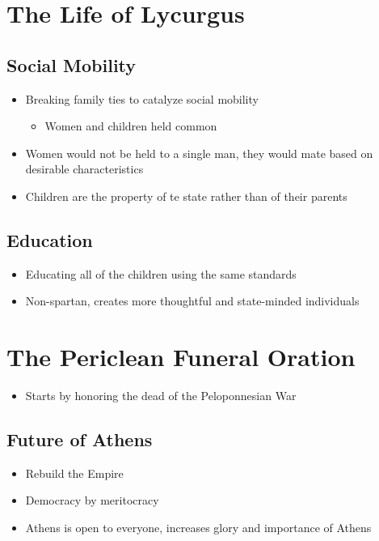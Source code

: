 \documentclass[11pt]{article}
\begin{document}
\section{The Life of Lycurgus}
\label{sec:orge5442ac}
\subsection{Social Mobility}
\label{sec:org0357bdb}
\begin{itemize}
\item Breaking family ties to catalyze social mobility
\begin{itemize}
\item Women and children held common
\end{itemize}
\item Women would not be held to a single man, they would mate based on desirable characteristics
\item Children are the property of te state rather than of their parents
\end{itemize}
\subsection{Education}
\label{sec:org96e54dc}
\begin{itemize}
\item Educating all of the children using the same standards
\item Non-spartan, creates more thoughtful and state-minded individuals
\end{itemize}
\section{The Periclean Funeral Oration}
\label{sec:orgf5ddf5b}
\begin{itemize}
\item Starts by honoring the dead of the Peloponnesian War
\end{itemize}
\subsection{Future of Athens}
\label{sec:orgd8268b5}
\begin{itemize}
\item Rebuild the Empire
\item Democracy by meritocracy
\item Athens is open to everyone, increases glory and importance of Athens
\end{itemize}
\end{document}
